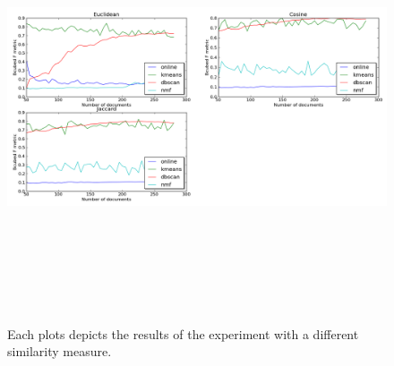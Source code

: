 \begin{figure}[htbp]
  \begin{center}
    \includegraphics[height=5in, width=6in]{number_of_documents}
    \caption{Each plots depicts the results of the experiment with a different similarity measure.}
    \label{DifferentSizeResults}
  \end{center}
\end{figure}

